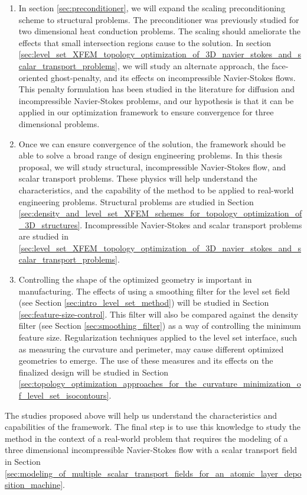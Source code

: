 \begin{enumerate}
	\item  In section \ref{sec:preconditioner}, we will expand the scaling preconditioning scheme to structural problems. The preconditioner was previously studied for two dimensional heat conduction problems. The scaling should ameliorate the effects that small intersection regions cause to the solution. In section \ref{sec:level_set_XFEM_topology_optimization_of_3D_navier_stokes_and_scalar_transport_problems}, we will study an alternate approach, the face-oriented ghost-penalty, and its effects on incompressible Navier-Stokes flows. This penalty formulation has been studied in the literature for diffusion and incompressible Navier-Stokes problems, and our hypothesis is that it can be applied in our optimization framework to ensure convergence for three dimensional problems.

	\item Once we can ensure convergence of the solution, the framework should be able to solve a broad range of design engineering problems. In this thesis proposal, we will study structural, incompressible Navier-Stokes flow, and scalar transport problems. These physics will help understand the characteristics, and the capability of the method to be applied to real-world engineering problems. Structural problems are studied in Section \ref{sec:density_and_level_set_XFEM_schemes_for_topology_optimization_of_3D_structures}. Incompressible Navier-Stokes and scalar transport problems are studied in \ref{sec:level_set_XFEM_topology_optimization_of_3D_navier_stokes_and_scalar_transport_problems}.

	\item Controlling the shape of the optimized geometry is important in manufacturing. The effects of using a smoothing filter for the level set field (see Section \ref{sec:intro_level_set_method}) will be studied in Section \ref{sec:feature-size-control}. This filter will also be compared against the density filter (see Section \ref{sec:smoothing_filter}) as a way of controlling the minimum feature size. Regularization techniques applied to the level set interface, such as measuring the curvature and perimeter, may cause different optimized geometries to emerge. The use of these measures and its effects on the finalized design will be studied in Section \ref{sec:topology_optimization_approaches_for_the_curvature_minimization_of_level_set_isocontours}.
\end{enumerate}

The studies proposed above will help us understand the characteristics and capabilities of the framework. The final step is to use this knowledge to study the method in the context of a real-world problem that requires the modeling of a three dimensional incompressible Navier-Stokes flow with a scalar transport field in Section \ref{sec:modeling_of_multiple_scalar_transport_fields_for_an_atomic_layer_deposition_machine}.

